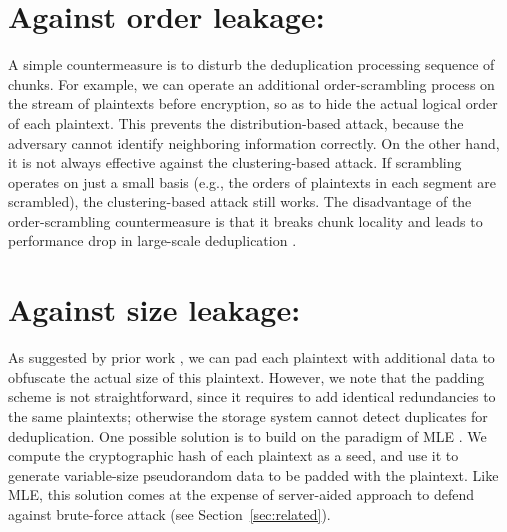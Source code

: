 \section{Against order leakage:}
A simple countermeasure is to disturb the deduplication processing sequence of chunks. For example, we can operate an additional order-scrambling process on the stream of plaintexts before encryption, so as to hide the actual logical order of each plaintext. This prevents the distribution-based attack, because the adversary cannot identify neighboring information correctly. On the other hand, it is not always effective against the clustering-based attack. If scrambling  operates on just a small basis (e.g., the orders of plaintexts in each segment are scrambled), the clustering-based attack still works. 
The disadvantage of the order-scrambling countermeasure is that it breaks chunk locality and leads to performance drop in large-scale deduplication \cite{xia11,zhu08,lillibridge09}. 



\section{Against size leakage:}
As suggested by prior work \cite{ritzdorf16}, we can pad each plaintext with additional data to obfuscate the actual size of this plaintext. However, we note that the padding scheme is not straightforward, since it requires to add identical redundancies to the same plaintexts; otherwise the storage system cannot detect duplicates for deduplication. One possible solution is to build on the paradigm of MLE \cite{bellare13b,bellare13a}. We compute the cryptographic hash of each plaintext as a seed, and use it to generate variable-size pseudorandom data to be padded with the  plaintext. Like MLE, this solution comes at the expense of server-aided approach \cite{bellare13b} to defend against brute-force attack (see Section~\ref{sec:related}).     


